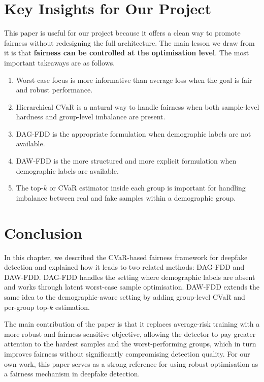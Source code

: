 
\section{Key Insights for Our Project}
\label{sec:ch4_insights}

This paper is useful for our project because it offers a clean way to promote fairness without redesigning the full architecture. The main lesson we draw from it is that \textbf{fairness can be controlled at the optimisation level}. The most important takeaways are as follows.

\begin{enumerate}
    \item Worst-case focus is more informative than average loss when the goal is fair and robust performance.
    \item Hierarchical CVaR is a natural way to handle fairness when both sample-level hardness and group-level imbalance are present.
    \item DAG-FDD is the appropriate formulation when demographic labels are not available.
    \item DAW-FDD is the more structured and more explicit formulation when demographic labels are available.
    \item The top-$k$ or CVaR estimator inside each group is important for handling imbalance between real and fake samples within a demographic group.
\end{enumerate}

\section{Conclusion}
\label{sec:ch4_conclusion}

In this chapter, we described the CVaR-based fairness framework for deepfake detection and explained how it leads to two related methods: DAG-FDD and DAW-FDD. DAG-FDD handles the setting where demographic labels are absent and works through latent worst-case sample optimisation. DAW-FDD extends the same idea to the demographic-aware setting by adding group-level CVaR and per-group top-$k$ estimation.

The main contribution of the paper is that it replaces average-risk training with a more robust and fairness-sensitive objective, allowing the detector to pay greater attention to the hardest samples and the worst-performing groups, which in turn improves fairness without significantly compromising detection quality. For our own work, this paper serves as a strong reference for using robust optimisation as a fairness mechanism in deepfake detection.
